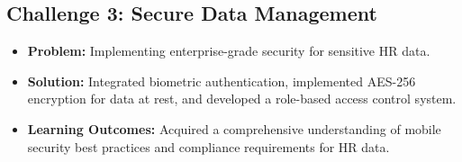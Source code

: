 \subsection{Challenge 3: Secure Data Management}
\begin{itemize}
    \item \textbf{Problem:} Implementing enterprise-grade security for sensitive HR data.
    \item \textbf{Solution:} Integrated biometric authentication, implemented AES-256 encryption for data at rest, and developed a role-based access control system.
    \item \textbf{Learning Outcomes:} Acquired a comprehensive understanding of mobile security best practices and compliance requirements for HR data.
\end{itemize}